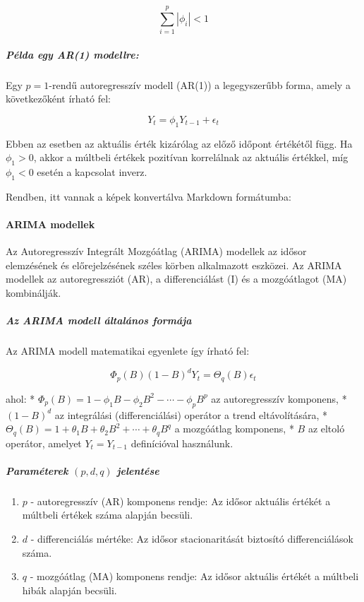 \documentclass[11pt]{article}
\providecommand{\tightlist}{%
      \setlength{\itemsep}{0pt}\setlength{\parskip}{0pt}}
\begin{document}
\[\sum_{i=1}^p |\phi_i| < 1\]

\subparagraph{Példa egy AR(1)
modellre:}\label{puxe9lda-egy-ar1-modellre}

Egy \(p = 1\)-rendű autoregresszív modell (AR(1)) a legegyszerűbb forma,
amely a következőként írható fel:

\[Y_t = \phi_1 Y_{t-1} + \epsilon_t\]

Ebben az esetben az aktuális érték kizárólag az előző időpont értékétől
függ. Ha \(\phi_1 > 0\), akkor a múltbeli értékek pozitívan korrelálnak
az aktuális értékkel, míg \(\phi_1 < 0\) esetén a kapcsolat inverz.

Rendben, itt vannak a képek konvertálva Markdown formátumba:

\paragraph{ARIMA modellek}\label{arima-modellek}

Az Autoregresszív Integrált Mozgóátlag (ARIMA) modellek az idősor
elemzésének és előrejelzésének széles körben alkalmazott eszközei. Az
ARIMA modellek az autoregressziót (AR), a differenciálást (I) és a
mozgóátlagot (MA) kombinálják.

\subparagraph{Az ARIMA modell általános
formája}\label{az-arima-modell-uxe1ltaluxe1nos-formuxe1ja}

Az ARIMA modell matematikai egyenlete így írható fel:

\[\Phi_p(B)(1 - B)^dY_t = \Theta_q(B)\epsilon_t\]

ahol: * \(\Phi_p(B) = 1 - \phi_1 B - \phi_2 B^2 - \cdots - \phi_p B^p\)
az autoregresszív komponens, * \((1 - B)^d\) az integrálási
(differenciálási) operátor a trend eltávolítására, *
\(\Theta_q(B) = 1 + \theta_1 B + \theta_2 B^2 + \cdots + \theta_q B^q\)
a mozgóátlag komponens, * \(B\) az eltoló operátor, amelyet
\(Y_t = Y_{t-1}\) definícióval használunk.

\subparagraph{\texorpdfstring{Paraméterek \((p, d, q)\)
jelentése}{Paraméterek (p, d, q) jelentése}}\label{paramuxe9terek-p-d-q-jelentuxe9se}

\begin{enumerate}
\def\labelenumi{\arabic{enumi}.}
\tightlist
\item
  \(p\) - autoregresszív (AR) komponens rendje: Az idősor aktuális
  értékét a múltbeli értékek száma alapján becsüli.
\item
  \(d\) - differenciálás mértéke: Az idősor stacionaritását biztosító
  differenciálások száma.
\item
  \(q\) - mozgóátlag (MA) komponens rendje: Az idősor aktuális értékét a
  múltbeli hibák alapján becsüli.
\end{enumerate}
\end{document}
